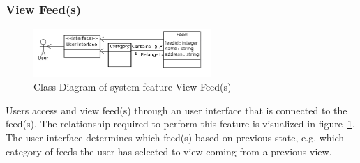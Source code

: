 \newpage
\subsubsection{View Feed(s)}
\begin{figure}[hbt]
\centering
\includegraphics[width=0.6\textwidth]
{./images/ViewFeeds.png}
\caption{Class Diagram of system feature View Feed(s)}
\label{fig:view}
\end{figure}
Users access and view feed(s) through an user interface that is connected to the feed(s). The relationship required to perform this feature is visualized in figure~\ref{fig:view}. The user interface determines which feed(s) based on previous state, e.g. which category of feeds the user has selected to view coming from a previous view. \\
